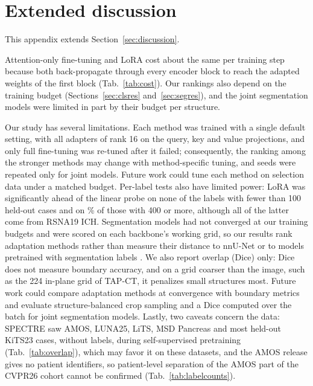 \section{Extended discussion}
\label{app:discussion}
This appendix extends Section~\ref{sec:discussion}.

Attention-only fine-tuning and LoRA cost about the same per training step because both back-propagate through every encoder block to reach the adapted weights of the first block (Tab.~\ref{tab:cost}). Our rankings also depend on the training budget (Sections~\ref{sec:clsres} and~\ref{sec:segres}), and the joint segmentation models were limited in part by their budget per structure.

Our study has several limitations. Each method was trained with a single default setting, with all adapters of rank 16 on the query, key and value projections, and only full fine-tuning was re-tuned after it failed; consequently, the ranking among the stronger methods may change with method-specific tuning, and seeds were repeated only for joint models. Future work could tune each method on selection data under a matched budget. Per-label tests also have limited power: LoRA was significantly ahead of the linear probe on none of the labels with fewer than 100 held-out cases and on \numSigbysizeLargeSig\% of those with 400 or more, although all of the latter come from RSNA19 ICH. Segmentation models had not converged at our training budgets and were scored on each backbone's working grid, so our results rank adaptation methods rather than measure their distance to nnU-Net \citep{isensee2021nnunet} or to models pretrained with segmentation labels \citep{li2024suprem,he2024vista3d}. We also report overlap (Dice) only: Dice does not measure boundary accuracy, and on a grid coarser than the image, such as the 224 in-plane grid of TAP-CT, it penalizes small structures most. Future work could compare adaptation methods at convergence with boundary metrics and evaluate structure-balanced crop sampling and a Dice computed over the batch for joint segmentation models. Lastly, two caveats concern the data: SPECTRE saw AMOS, LUNA25, LiTS, MSD Pancreas and most held-out KiTS23 cases, without labels, during self-supervised pretraining (Tab.~\ref{tab:overlap}), which may favor it on these datasets, and the AMOS release gives no patient identifiers, so patient-level separation of the AMOS part of the CVPR26 cohort cannot be confirmed (Tab.~\ref{tab:labelcounts}).

